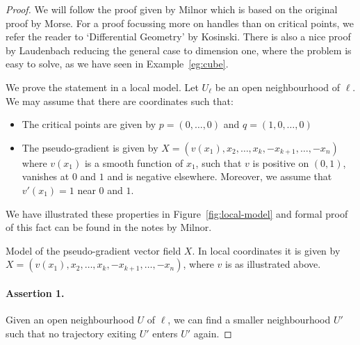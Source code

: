 \begin{proof}
    We will follow the proof given by Milnor which is based on the original proof by Morse.
    For a proof focussing more on handles than on critical points, we refer the reader to `Differential Geometry' by Kosinski.
    There is also a nice proof by Laudenbach reducing the general case to dimension one, where the problem is easy to solve, as we have seen in Example~\ref{eg:cube}.

We prove the statement in a local model.
Let $U_\ell$ be an open neighbourhood of $\ell$. 
We may assume that there are coordinates such that:
\begin{itemize}
    \item  The critical points are given by $p = (0, \ldots, 0)$ and $q = (1, 0, \ldots, 0)$
    \item The pseudo-gradient is given by $X = (v(x_1), x_2, \ldots, x_k, -x_{k+1}, \ldots, -x_n)$ where $v(x_1)$ is a smooth function of $x_1$, such that  $v$ is positive on  $(0, 1)$, vanishes at $0$ and $1$ and is negative elsewhere.
        Moreover, we assume that  $v'(x_1) = 1$ near $0$ and $1$.
\end{itemize}
We have illustrated these properties in Figure~\ref{fig:local-model} and formal proof of this fact can be found in the notes by Milnor.
\begin{marginfigure}
    \centering
    \caption{Model of the pseudo-gradient vector field $X$. In local coordinates it is given by $X = (v(x_1), x_2, \ldots, x_k, -x_{k+1}, \ldots, -x_n)$, where $v$ is as illustrated above.
    }
    \label{fig:local-model}
\end{marginfigure}

\renewcommand{\qedsymbol}{\ensuremath{\blacksquare}}

\paragraph{Assertion 1.}
Given an open neighbourhood $U$ of  $ \ell$, we can find a smaller neighbourhood $U'$ such that no trajectory exiting $U'$ enters $U'$ again.


\end{proof}
